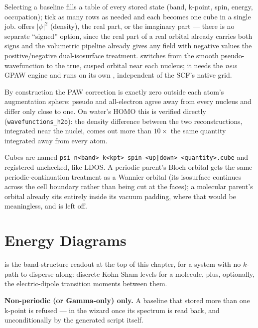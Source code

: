 Selecting a baseline fills a table of every stored state (band, k-point,
spin, energy, occupation); tick as many rows as needed and each becomes one
cube in a single job.  offers $|\psi|^2$ (density), the real
part, or the imaginary part --- there is no separate ``signed'' option,
since the real part of a real orbital already carries both signs and the
volumetric pipeline already gives any field with negative values the
positive/negative dual-isosurface treatment.  switches from the smooth pseudo-wavefunction to the true,
cusped orbital near each nucleus; it needs the \emph{new} GPAW engine and
runs on its own , independent of the SCF's native grid.

\begin{calnote}
By construction the PAW correction is exactly zero outside each atom's
augmentation sphere: pseudo and all-electron agree away from every nucleus
and differ only close to one. On water's HOMO this is verified directly
(\texttt{wavefunctions\_h2o}): the density difference between the two
reconstructions, integrated near the nuclei, comes out more than $10\times$
the same quantity integrated away from every atom.
\end{calnote}

Cubes are named \texttt{psi\_n<band>\_k<kpt>\_spin-<up|down>\_<quantity>.cube}
and registered unchecked, like LDOS. A periodic parent's Bloch orbital gets
the same periodic-continuation treatment as a Wannier orbital (its
isosurface continues across the cell boundary rather than being cut at the
faces); a molecular parent's orbital already sits entirely inside its
vacuum padding, where that would be meaningless, and is left off.

\section{Energy Diagrams}
\label{sec:energydiagrams}

\menusep{} is the band-structure
readout at the top of this chapter, for a system with no $k$-path to
disperse along: discrete Kohn-Sham levels for a molecule, plus, optionally,
the electric-dipole transition moments between them.

\begin{calwarn}
\textbf{Non-periodic (or Gamma-only) only.} A baseline that stored more than
one k-point is refused --- in the wizard once its spectrum is read back, and
unconditionally by the generated script itself.
\end{calwarn}


